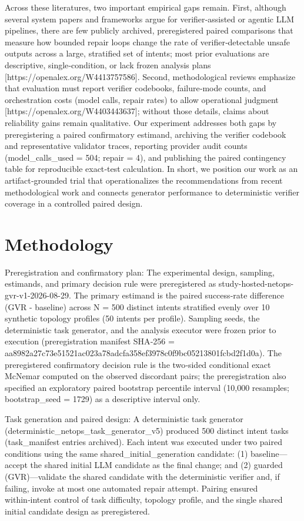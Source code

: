 \documentclass[conference]{IEEEtran}
\begin{document}
Across these literatures, two important empirical gaps remain. First, although several system papers and frameworks argue for verifier‑assisted or agentic LLM pipelines, there are few publicly archived, preregistered paired comparisons that measure how bounded repair loops change the rate of verifier‑detectable unsafe outputs across a large, stratified set of intents; most prior evaluations are descriptive, single‑condition, or lack frozen analysis plans [https://openalex.org/W4413757586]. Second, methodological reviews emphasize that evaluation must report verifier codebooks, failure‑mode counts, and orchestration costs (model calls, repair rates) to allow operational judgment [https://openalex.org/W4403443637]; without those details, claims about reliability gains remain qualitative. Our experiment addresses both gaps by preregistering a paired confirmatory estimand, archiving the verifier codebook and representative validator traces, reporting provider audit counts (model\_calls\_used = 504; repair = 4), and publishing the paired contingency table for reproducible exact‑test calculation. In short, we position our work as an artifact‑grounded trial that operationalizes the recommendations from recent methodological work and connects generator performance to deterministic verifier coverage in a controlled paired design.

\section{Methodology}
Preregistration and confirmatory plan: The experimental design, sampling, estimands, and primary decision rule were preregistered as study-hosted-netops-gvr-v1-2026-08-29. The primary estimand is the paired success‑rate difference (GVR - baseline) across N = 500 distinct intents stratified evenly over 10 synthetic topology profiles (50 intents per profile). Sampling seeds, the deterministic task generator, and the analysis executor were frozen prior to execution (preregistration manifest SHA‑256 = aa8982a2\allowbreak{}7c73e515\allowbreak{}21ac023a\allowbreak{}78adcfa3\allowbreak{}58ef3978\allowbreak{}c0f9bc05\allowbreak{}213801fc\allowbreak{}bd2f1d0a). The preregistered confirmatory decision rule is the two‑sided conditional exact McNemar computed on the observed discordant pairs; the preregistration also specified an exploratory paired bootstrap percentile interval (10,000 resamples; bootstrap\_seed = 1729) as a descriptive interval only.

Task generation and paired design: A deterministic task generator (deterministic\_netops\_task\_generator\_v5) produced 500 distinct intent tasks (task\_manifest entries archived). Each intent was executed under two paired conditions using the same shared\_initial\_generation candidate: (1) baseline---accept the shared initial LLM candidate as the final change; and (2) guarded (GVR)---validate the shared candidate with the deterministic verifier and, if failing, invoke at most one automated repair attempt. Pairing ensured within‑intent control of task difficulty, topology profile, and the single shared initial candidate design as preregistered.
\end{document}
